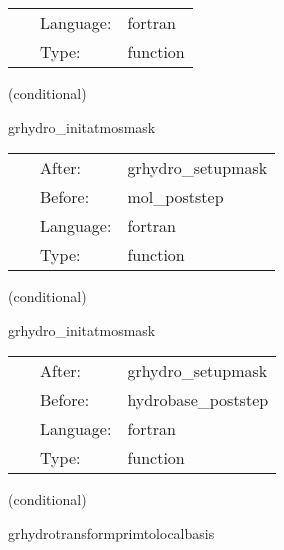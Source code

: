 \documentclass{article}
\begin{document}
 \begin{tabular*}{160mm}{cll} 
~ & Language:  & fortran \\ 
~ & Type:  & function \\ 
\end{tabular*} 


\vspace{5mm}

   (conditional) 

\hspace{5mm} grhydro\_initatmosmask 

\hspace{5mm}{\it set the atmosphere mask } 


\hspace{5mm}

 \begin{tabular*}{160mm}{cll} 
~ & After:  & grhydro\_setupmask \\ 
~ & Before:  & mol\_poststep \\ 
~ & Language:  & fortran \\ 
~ & Type:  & function \\ 
\end{tabular*} 


\vspace{5mm}

   (conditional) 

\hspace{5mm} grhydro\_initatmosmask 

\hspace{5mm}{\it set the atmosphere mask } 


\hspace{5mm}

 \begin{tabular*}{160mm}{cll} 
~ & After:  & grhydro\_setupmask \\ 
~ & Before:  & hydrobase\_poststep \\ 
~ & Language:  & fortran \\ 
~ & Type:  & function \\ 
\end{tabular*} 


\vspace{5mm}

   (conditional) 

\hspace{5mm} grhydrotransformprimtolocalbasis 

\hspace{5mm}{\it transform primitive vars to local tensor basis. } 
\end{document}
